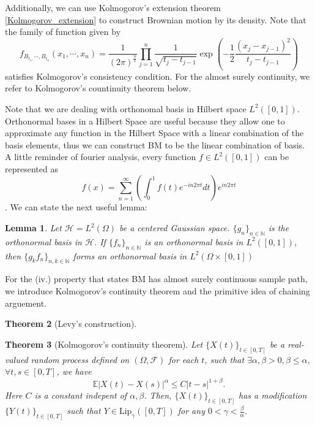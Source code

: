 \documentclass[11pt,english]{smfart}
\newtheorem{theorem}{Theorem}[subsection]
\newtheorem{lemma}[theorem]{Lemma}
\newcommand{\mb}{\mathbb}
\newcommand{\mc}{\mathcal}
\begin{document}
Additionally, we can use Kolmogorov's extension theorem \ref{Kolmogorov_extension} to construct Brownian motion by its density. Note that the family of function given by $$f_{B_{t_1,}\cdots,B_{t_n}} (x_1,\cdots,x_n) = \frac{1}{(2\pi)^{\frac{n}{2}}}\prod_{j=1}^n \frac{1}{\sqrt{t_j - t_{j-1}}} \exp \left(-\frac{1}{2} \frac{(x_j - x_{j-1})^2}{t_j - t_{j-1}}\right)$$ satisfies Kolmogorov's consistency condition. For the almost surely continuity, we refer to Kolmogorov's countinuity theorem below. 

Note that we are dealing with orthonomal basis in Hilbert space $L^2([0,1])$. Orthonormal bases in a Hilbert Space are useful because they allow one to approximate any function in the Hilbert Space with a linear combination of the basis elements, thus we can construct BM to be the linear combination of basis. A little reminder of fourier analysis, every function $f\in L^2([0,1])$ can be represented as $$f(x) = \sum_{n=1}^\infty \left(\int_0^1 f(t)e^{-in2\pi t} dt\right)e^{in2\pi t}$$. We can state the next useful lemma:\\

\begin{lemma}
    Let $\mc{H} = L^2(\Omega)$ be a centered Gaussian space. $\{g_n\}_{n\in \mb{N}}$ is the orthonormal basis in $\mc{H}$. If $\{f_n\}_{n\in \mb{N}}$ is an orthonormal basis in $L^2([0,1])$, then $\{g_k f_n\}_{n,k\in \mb{N}}$ forms an orthonormal basis in $L^2(\Omega \times [0,1])$
\end{lemma}


For the (iv.) property that states BM has almost surely continuous sample path, we introduce Kolmogorov's continuity theorem and the primitive idea of chaining arguement. \\

\begin{theorem}[Levy's construction]
    
\end{theorem}

\begin{theorem}[Kolmogorov's continuity theorem]
    Let $\{X(t)\}_{t\in [0,T]}$ be a real-valued random process defined on $(\Omega,\mc{F})$ for each $t$, such that $\exists \alpha ,\beta > 0, \beta \leq \alpha,$ $\forall t,s \in [0,T]$, we have $$\mb{E}\left|X(t) - X(s)\right|^\alpha \leq C|t-s|^{1+\beta}.$$ Here $C$ is a constant indepent of $\alpha,\beta$. Then, $\{X(t)\}_{t\in [0,T]}$ has a modification $\{Y(t)\}_{t\in [0,T]}$ such that $Y\in \text{Lip}_{\gamma}([0,T])$ for any $0< \gamma < \frac{\beta}{\alpha}$.
\end{theorem}
\end{document}
